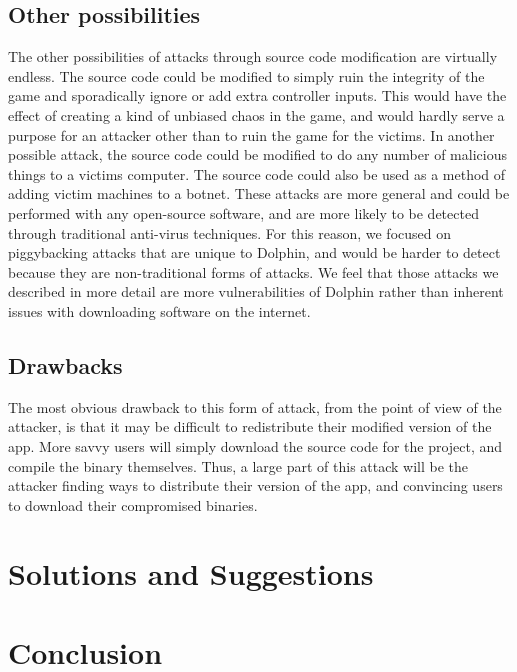 \documentclass[conference]{IEEEtran}
\begin{document}
\subsection{Other possibilities}
The other possibilities of attacks through source code modification are virtually endless.
The source code could be modified to simply ruin the integrity of the game and sporadically ignore or add extra controller inputs.
This would have the effect of creating a kind of unbiased chaos in the game, and would hardly serve a purpose for an attacker other than to ruin the game for the victims.
In another possible attack, the source code could be modified to do any number of malicious things to a victims computer.
The source code could also be used as a method of adding victim machines to a botnet.
These attacks are more general and could be performed with any open-source software, and are more likely to be detected through traditional anti-virus techniques.
For this reason, we focused on piggybacking attacks that are unique to Dolphin, and would be harder to detect because they are non-traditional forms of attacks.
We feel that those attacks we described in more detail are more vulnerabilities of Dolphin rather than inherent issues with downloading software on the internet.
\subsection{Drawbacks}
The most obvious drawback to this form of attack, from the point of view of the attacker, is that it may be difficult to redistribute their modified version of the app.
More savvy users will simply download the source code for the project, and compile the binary themselves.
Thus, a large part of this attack will be the attacker finding ways to distribute their version of the app, and convincing users to download their compromised binaries.
\section{Solutions and Suggestions}

\section{Conclusion}




\end{document}

